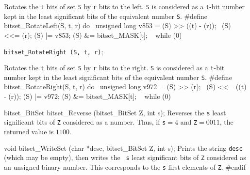  \tab  Rotates the {\tt t} bits of set {\tt S} by {\tt r} bits to the left.
  {\tt S} is considered as a {\tt t}-bit number kept
  in the least significant bits of the equivalent number {\tt S}.
 \endtab
\code
\hide
#define bitset_RotateLeft(S, t, r) do { \
   unsigned long v853 = (S) >> ((t) - (r)); \
   (S) <<= (r);   (S) |= v853;   (S) &= bitset_MASK[t]; \
   } while (0)
\endhide
\endcode

\noindent
{\tt bitset\_RotateRight (S, t, r)};

 \tab  Rotates the {\tt t} bits of set {\tt S} by {\tt r} bits to the right.
  {\tt S} is considered as a {\tt t}-bit number kept
  in the least significant bits of the equivalent number {\tt S}.
 \endtab
\code
\hide
#define bitset_RotateRight(S, t, r) do { \
   unsigned long v972 = (S) >> (r); \
   (S) <<= ((t) - (r));   (S) |= v972;   (S) &= bitset_MASK[t]; \
   } while (0)
\endhide
\endcode




\code

bitset_BitSet bitset_Reverse (bitset_BitSet Z, int s);
\endcode
\tab Reverses the {\tt s} least significant bits of {\tt Z} considered as a
number. Thus, if {\tt s}${}=4$ and {\tt Z}${}=0011$, the returned value is $1100$.
 \endtab
\code


void bitset_WriteSet (char *desc, bitset_BitSet Z, int s);
\endcode
  \tab
  Prints the string {\tt desc} (which may be empty), then writes the {\tt
  s} least significant bits of {\tt Z} considered as an unsigned binary number.
  This corresponds to the {\tt s} first elements of {\tt Z}.
 \endtab
\code
\hide
#endif
\endhide
\endcode
